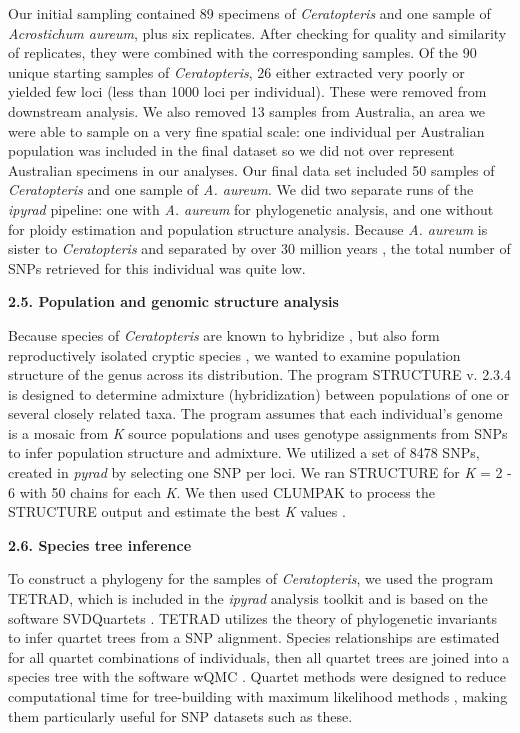 \documentclass[12pt]{article}
\begin{document}
\begin{flushleft}
Our initial sampling contained 89 specimens of \textit{Ceratopteris} and one sample of \textit{Acrostichum aureum}, plus six replicates. After checking for quality and similarity of replicates, they were combined with the corresponding samples. Of the 90 unique starting samples of \textit{Ceratopteris}, 26 either extracted very poorly or yielded few loci (less than 1000 loci per individual). These were removed from downstream analysis. We also removed 13 samples from Australia, an area we were able to sample on a very fine spatial scale: one individual per Australian population was included in the final dataset so we did not over represent Australian specimens in our analyses. Our final data set included 50 samples of \textit{Ceratopteris} and one sample of \textit{A. aureum}.  We did two separate runs of the \textit{ipyrad} pipeline: one with \textit{A. aureum} for phylogenetic analysis, and one without for ploidy estimation and population structure analysis. Because \textit{A. aureum} is sister to \textit{Ceratopteris} and separated by over 30 million years \autocite{PPGI}, the total number of SNPs retrieved for this individual was quite low.

\textbf{2.5. Population and genomic structure analysis}

Because species of \textit{Ceratopteris} are known to hybridize \autocite{hickok1974}, but also form reproductively isolated cryptic species \autocite{Masuyama2002}, we wanted to examine population structure of the genus across its distribution. The program {\small{STRUCTURE}} v. 2.3.4 \autocite{Pritchard2000} is designed to determine admixture (hybridization) between populations of one or several closely related taxa. The program assumes that each individual's genome is a mosaic from \textit{K} source populations and uses genotype assignments from SNPs to infer population structure and admixture. We utilized a set of 8478 SNPs, created in \textit{pyrad} by selecting one SNP per loci. We ran {\small{STRUCTURE}} for \textit{K} = 2 - 6 with 50 chains for each \textit{K}. We then used {\small{CLUMPAK}} \autocite{Kopelman2015} to process the {\small{STRUCTURE}} output and estimate the best \textit{K} values \autocite{Evanno2005, Pritchard2000}.

\textbf{2.6. Species tree inference}

To construct a phylogeny for the samples of \textit{Ceratopteris}, we used the program {\small{TETRAD}}, which is included in the \textit{ipyrad} analysis toolkit and is based on the software \small{SVDQuartets} \autocite{Chifman2015}. {\small{TETRAD}} utilizes the theory of phylogenetic invariants to infer quartet trees from a SNP alignment. Species relationships are estimated for all quartet combinations of individuals, then all quartet trees are joined into a species tree with the software {\small{wQMC}} \autocite{Avni2015}. Quartet methods were designed to reduce computational time for tree-building with maximum likelihood methods \autocite{Ranwez2001}, making them particularly useful for SNP datasets such as these.


\end{flushleft}
\end{document}
